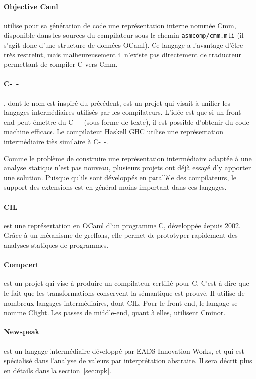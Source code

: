 \paragraph{Objective Caml} utilise pour sa génération de code
une représentation interne nommée Cmm, disponible dans les sources du
compilateur sous le chemin \texttt{asmcomp/cmm.mli} (il s'agit donc d'une
structure de données OCaml). Ce langage a l'avantage d'être très restreint, mais
malheureusement il n'existe pas directement de traducteur permettant de compiler
C vers Cmm.

\paragraph{C-~-}\cite{spjcmm} , dont le nom est inspiré du précédent,
est un projet qui visait à unifier les langages intermédiaires utilisés par les
compilateurs. L'idée est que si un front-end peut émettre du C-~- (sous forme de
texte), il est possible d'obtenir du code machine efficace. Le compilateur
Haskell GHC utilise une représentation intermédiaire très similaire à C-~-.

Comme le problème de construire une représentation intermédiaire adaptée à une
analyse statique n'est pas nouveau, plusieurs projets ont déjà essayé d'y
apporter une solution. Puisque qu'ils sont développés en parallèle des
compilateurs, le support des extensions est en général moins important dans ces
langages.

\paragraph{CIL}\cite{NeculaCil}  est une représentation en
OCaml d'un programme C, développée depuis 2002. Grâce à un mécanisme de
greffons, elle permet de prototyper rapidement des analyses statiques de
programmes.

\paragraph{Compcert} est un projet qui vise à produire un compilateur certifié
pour C. C'est à dire que le fait que les transformations conservent la
sémantique est prouvé. Il utilise de nombreux langages intermédiaires, dont CIL.
Pour le front-end, le langage se nomme Clight\cite{cfront}. Les passes de
middle-end, quant à elles, utilisent Cminor\cite{cminorSL}.

\paragraph{Newspeak}\cite{newspeak} est un langage intermédiaire développé par
EADS Innovation Works, et qui est spécialisé dans l'analyse de valeurs par
interprétation abstraite. Il sera décrit plus en détails dans la
section~\ref{sec:npk}.


